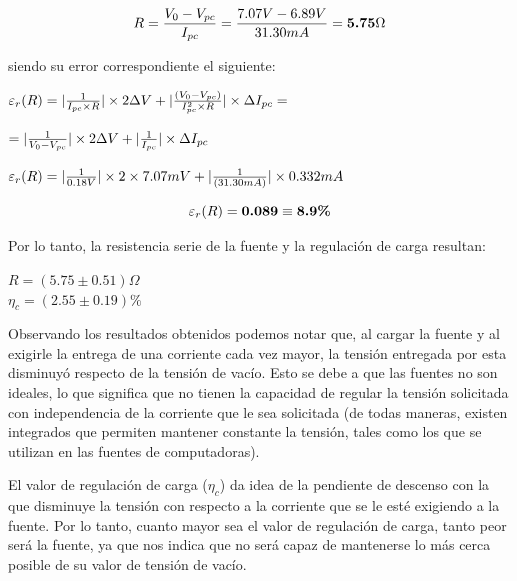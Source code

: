 \documentclass{article}
\begin{document}
\begin{equation}
	R = {V_{0} - V_{pc} \over I_{pc}} = {7.07V - 6.89V \over 31.30mA} = \textbf{5.75$\Omega$} \\
\end{equation}
\bigskip


\noindent siendo su error correspondiente el siguiente:
\bigskip


\begin{center}
	$\varepsilon_r(R) = |{1\over I_{pc} \times R}|\times 2\Delta V + |{(V_{0}-V_{pc})  \over  I_{pc}^2  \times R}| \times \Delta I_{pc} =$ \\
\end{center}

\begin{center}
$= |{1\over V_{0} - V_{pc}}|\times 2\Delta V + |{1 \over  I_{pc}}| \times \Delta I_{pc}$\\
\end{center}

\begin{center}
	$\varepsilon_r(R) = |{1\over 0.18V}|\times 2\times 7.07mV+ |{1  \over  (31.30mA)}| \times 0.332mA$ \\
\end{center}

\begin{equation}
	\varepsilon_r(R) = \textbf{0.089} \equiv \textbf{8.9\%} \\
\end{equation}
\bigskip\bigskip


\noindent Por lo tanto, la resistencia serie de la fuente y la regulación de carga resultan:
\medskip

\begin{center}
	$R = (5.75 \pm 0.51)\Omega $ \\ \medskip
	$\eta_c = (2.55 \pm 0.19)\% $ 
\end{center}
\bigskip\bigskip



	Observando los resultados obtenidos podemos notar que, al cargar la fuente y al exigirle la entrega de una corriente cada vez mayor, la tensión entregada por esta disminuyó respecto de la tensión de vacío. Esto se debe a que las fuentes no son ideales, lo que significa que no tienen la capacidad de regular la tensión solicitada con independencia de la corriente que le sea solicitada (de todas maneras, existen integrados que permiten mantener constante la tensión, tales como los que se utilizan en las fuentes de computadoras).
	\par
	El valor de regulación de carga ($\eta_c$) da idea de la pendiente de descenso con la que disminuye la tensión con respecto a la corriente que se le esté exigiendo a la fuente. Por lo tanto, cuanto mayor sea el valor de regulación de carga, tanto peor será la fuente, ya que nos indica que no será capaz de mantenerse lo más cerca posible de su valor de tensión de vacío.
\bigskip\bigskip\medskip
\end{document}
